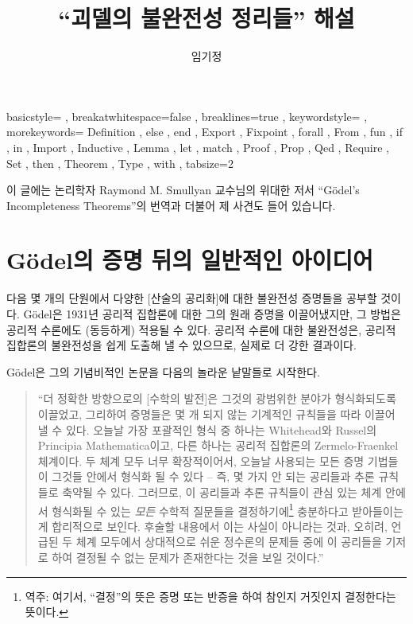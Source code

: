 \documentclass[12pt]{paper}
\title{``괴델의 불완전성 정리들'' 해설}
\author{임기정}
\begin{document}
  \lstset
  { basicstyle=\footnotesize\ttfamily
  , breakatwhitespace=false
  , breaklines=true
  , keywordstyle=\color{blue}
  , morekeywords=
    { Definition
    , else
    , end
    , Export
    , Fixpoint
    , forall
    , From
    , fun
    , if
    , in
    , Import
    , Inductive
    , Lemma
    , let
    , match
    , Proof
    , Prop
    , Qed
    , Require
    , Set
    , then
    , Theorem
    , Type
    , with
    }
  , tabsize=2
  }

  \maketitle

  이 글에는 논리학자 Raymond M. Smullyan 교수님의 위대한 저서 ``G\"odel's Incompleteness Theorems''의 번역과 더불어 제 사견도 들어 있습니다.

  \section{G\"odel의 증명 뒤의 일반적인 아이디어}
  \hspace{12pt}

  다음 몇 개의 단원에서 다양한 [산술의 공리화]에 대한 불완전성 증명들을 공부할 것이다.
  G\"odel은 1931년 공리적 집합론에 대한 그의 원래 증명을 이끌어냈지만,
  그 방법은 공리적 수론에도 (동등하게) 적용될 수 있다.
  공리적 수론에 대한 불완전성은,
  공리적 집합론의 불완전성을 쉽게 도출해 낼 수 있으므로,
  실제로 더 강한 결과이다.
  
  G\"odel은 그의 기념비적인 논문을 다음의 놀라운 낱말들로 시작한다.

  \begin{quotation}
    ``더 정확한 방향으로의 [수학의 발전]은 그것의 광범위한 분야가 형식화되도록 이끌었고,
    그리하여 증명들은 몇 개 되지 않는 기계적인 규칙들을 따라 이끌어 낼 수 있다.
    오늘날 가장 포괄적인 형식 중 하나는 Whitehead와 Russel의 Principia Mathematica이고,
    다른 하나는 공리적 집합론의 Zermelo-Fraenkel 체계이다.
    두 체계 모두 너무 확장적이어서,
    오늘날 사용되는 모든 증명 기법들이 그것들 안에서 형식화 될 수 있다 --
    즉, 몇 가지 안 되는 공리들과 추론 규칙들로 축약될 수 있다.
    그러므로, 이 공리들과 추론 규칙들이 관심 있는 체계 안에서 형식화될 수 있는 \textit{모든} 수학적 질문들을 결정하기에\footnote
    {
      역주: 여기서, ``결정''의 뜻은 증명 또는 반증을 하여 참인지 거짓인지 결정한다는 뜻이다.
    }
    충분하다고 받아들이는 게 합리적으로 보인다.
    후술할 내용에서 이는 사실이 아니라는 것과,
    오히려, 언급된 두 체계 모두에서 상대적으로 쉬운 정수론의 문제들 중에 이 공리들을 기저로 하여 결정될 수 없는 문제가 존재한다는 것을 보일 것이다.''
  \end{quotation}
\end{document}
